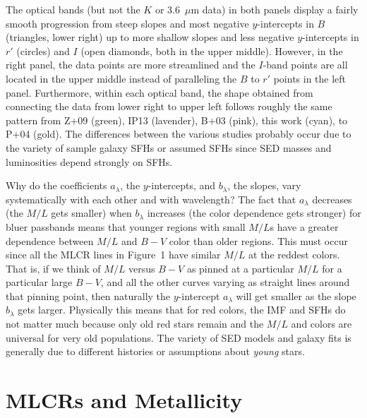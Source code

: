 \documentclass[12pt]{emulateapj}
\begin{document}
The optical bands (but not the $K$ or 3.6~$\mu$m data) in both panels display a fairly smooth progression from steep slopes and most negative $y$-intercepts in $B$ (triangles, lower right) up to more shallow slopes and less negative $y$-intercepts in $r'$ (circles) and $I$ (open diamonds, both in the upper middle).  However, in the right panel, the data points are more streamlined and the $I$-band points are all located in the upper middle instead of paralleling the $B$ to $r'$ points in the left panel.  Furthermore, within each optical band, the shape obtained from connecting the data from lower right to upper left follows roughly the same pattern from Z+09 (green), IP13 (lavender), B+03 (pink), this work (cyan), to P+04 (gold).  The differences between the various studies probably occur due to the variety of sample galaxy SFHs or assumed SFHs since SED masses and luminosities depend strongly on SFHs.

Why do the coefficients $a_{\lambda}$, the $y$-intercepts, and $b_{\lambda}$, the slopes, vary systematically with each other and with wavelength?  The fact that $a_{\lambda}$ decreases (the $M/L$ gets smaller) when $b_{\lambda}$ increases (the color dependence gets stronger) for bluer passbands means that younger regions with small $M/L$s have a greater dependence between $M/L$ and $B-V$ color than older regions.  This must occur since all the MLCR lines in Figure~1 have similar $M/L$ at the reddest colors.  That is, if we think of $M/L$ versus $B-V$ as pinned at a particular $M/L$ for a particular large $B-V$, and all the other curves varying as straight lines around that pinning point, then naturally the $y$-intercept $a_{\lambda}$ will get smaller as the slope $b_{\lambda}$ gets larger.  Physically this means that for red colors, the IMF and SFHs do not matter much because only old red stars remain and the $M/L$ and colors are universal for very old populations.  The variety of SED models and galaxy fits is generally due to different histories or assumptions about {\it young} stars.

\section{MLCRs and Metallicity} \label{sec-Zbins}
\end{document}
